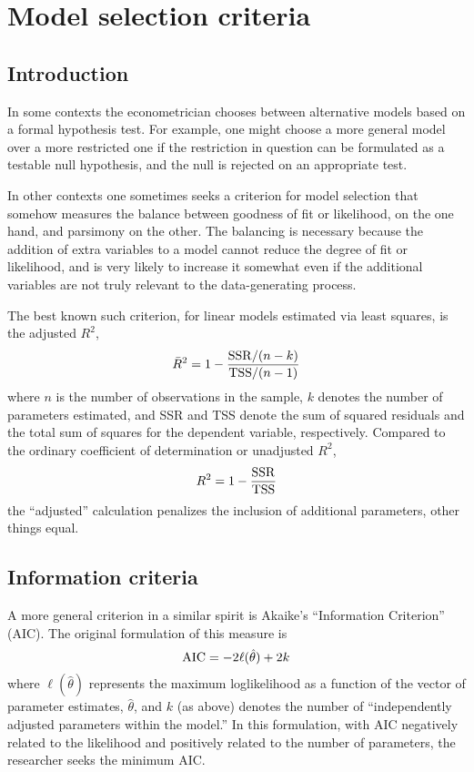 \chapter{Model selection criteria}
\label{chap:criteria}

\section{Introduction}
\label{select-intro}

In some contexts the econometrician chooses between alternative models
based on a formal hypothesis test.  For example, one might choose a
more general model over a more restricted one if the restriction in
question can be formulated as a testable null hypothesis, and the null
is rejected on an appropriate test.

In other contexts one sometimes seeks a criterion for model selection
that somehow measures the balance between goodness of fit or
likelihood, on the one hand, and parsimony on the other.  The
balancing is necessary because the addition of extra variables to a
model cannot reduce the degree of fit or likelihood, and is very
likely to increase it somewhat even if the additional variables are
not truly relevant to the data-generating process.

The best known such criterion, for linear models estimated via least
squares, is the adjusted $R^2$,
%
\[
\bar{R}^2 = 1 - \frac{{\rm SSR} / (n-k)}{{\rm TSS} / (n-1)}
\]
%
where $n$ is the number of observations in the sample, $k$ denotes the
number of parameters estimated, and SSR and TSS denote the sum of
squared residuals and the total sum of squares for the dependent
variable, respectively.  Compared to the ordinary coefficient of
determination or unadjusted $R^2$,
%
\[
R^2 = 1 - \frac{{\rm SSR}}{{\rm TSS}}
\]
%
the ``adjusted'' calculation penalizes the inclusion of additional
parameters, other things equal.  

\section{Information criteria}
\label{select-aic}

A more general criterion in a similar spirit is Akaike's
\citeyearpar{akaike74} ``Information Criterion'' (AIC).  The original
formulation of this measure is
%
\begin{equation}
\label{aic-orig}
{\rm AIC} = -2 \ell(\hat{\theta}) + 2k
\end{equation}
%
where $\ell(\hat{\theta})$ represents the maximum loglikelihood as a
function of the vector of parameter estimates, $\hat{\theta}$, and $k$
(as above) denotes the number of ``independently adjusted parameters
within the model.''  In this formulation, with AIC negatively related
to the likelihood and positively related to the number of parameters,
the researcher seeks the minimum AIC.

